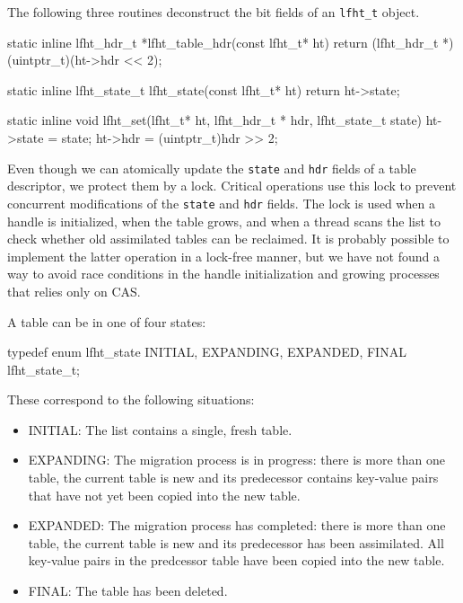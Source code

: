 The following three routines deconstruct the bit fields of an \texttt{lfht\_t} object.
\begin{center}
\begin{clisting}
static inline lfht_hdr_t *lfht_table_hdr(const lfht_t* ht){
  return (lfht_hdr_t *)(uintptr_t)(ht->hdr << 2);
}

static inline lfht_state_t lfht_state(const lfht_t* ht){
  return ht->state;
}

static inline void lfht_set(lfht_t* ht, lfht_hdr_t * hdr, lfht_state_t state){
  ht->state = state;
  ht->hdr = (uintptr_t)hdr >> 2;
}
\end{clisting}
\end{center}


Even though we can atomically update the \texttt{state} and
\texttt{hdr} fields of a table descriptor, we protect them by a lock.
Critical operations use this lock to prevent concurrent modifications
of the \texttt{state} and \texttt{hdr} fields. The lock is used when a
handle is initialized, when the table grows, and when a thread scans
the list to check whether old assimilated tables can be reclaimed.
It is probably possible to implement the latter operation in a
lock-free manner, but we have not found a way to avoid race conditions
in the handle initialization and growing processes that relies only on CAS.


A table can be in one of four states:
\begin{center}
\begin{clisting}
  typedef enum lfht_state {
    INITIAL,
    EXPANDING,
    EXPANDED,
    FINAL
  } lfht_state_t;
\end{clisting}
\end{center}
These correspond to the following situations:
\begin{itemize}
\item INITIAL: The list contains a single, fresh table.
\item EXPANDING: The migration process is in progress: there is more
  than one table, the current table is new and its predecessor
  contains key-value pairs that have not yet been copied into the new
  table.
\item EXPANDED: The migration process has completed: there is more
  than one table, the current table is new and its predecessor has
  been assimilated. All key-value pairs in the predcessor table have
  been copied into the new table.
\item FINAL: The table has been deleted.
\end{itemize}
  
